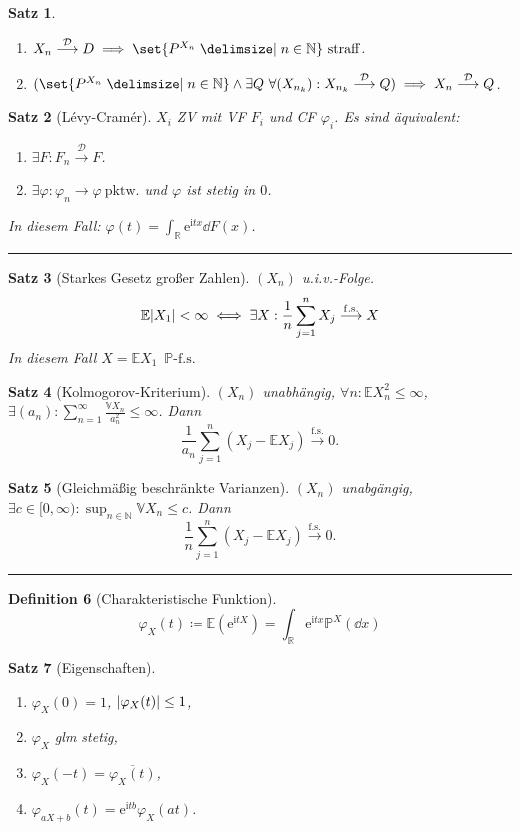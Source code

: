 \documentclass[a4paper,8pt]{article}
\newcounter{Sec}
\theoremstyle{nonumberbreak}
\newtheorem{definition}{Definition}[Sec]
\newtheorem{satz}[definition]{Satz}
\newcommand{\sep}{%
	\rule{\linewidth}{0.15pt}%
	\stepcounter{Sec}%
	}
\newcommand{\defas}{\coloneqq}
\newcommand{\conj}{\overline}
\renewcommand{\P}{\mathbb{P}}
\newcommand{\R}{\mathbb{R}}
\newcommand{\E}{\mathbb{E}}
\newcommand{\V}{\mathbb{V}}
\newcommand{\N}{\mathbb{N}}
\newcommand{\cf}{\varphi}
\newcommand{\e}{\mathrm{e}}
\renewcommand{\i}{\mathrm{i}}
\newcommand{\fsk}{\mathrel{\stackrel{\operatorname{f.s.}}{\longrightarrow}}}
\newcommand{\vk}{\mathrel{\stackrel{\mathcal{D}}{\longrightarrow}}}
\newcommand{\fs}[1]{~\operatorname{#1-f.s.}}
\begin{document}
\begin{multicols*}{3}
\begin{satz}
		\begin{enumerate}[label=(\alph*)]
			\item $X_n\vk D\implies\set{P^{X_n}\given n\in\N}~\text{straff}$.
			\item $(\set{P^{X_n}\given n\in\N}\wedge \exists Q~\forall (X_{n_k}): X_{n_k}\vk Q)\implies X_n\vk Q$.
		\end{enumerate}
	\end{satz}
	\begin{satz}[Lévy-Cramér]
		$X_i$ ZV mit VF $F_i$ und CF $\cf_i$. Es sind äquivalent:
		\begin{enumerate}[label=(\alph*)]
			\item $\exists F: F_n\vk F$.
			\item $\exists \cf: \cf_n\to\cf~\text{pktw.}$ und $\cf$ ist stetig in $0$.
		\end{enumerate}
		In diesem Fall: $\cf(t)=\int_\R\e^{\i tx}\dd{F(x)}$.
	\end{satz}
	\sep
	\begin{satz}[Starkes Gesetz großer Zahlen]
		$(X_n)$ u.i.v.-Folge.
		\[
			\E\abs{X_1}<\infty\iff
			\exists X:\frac{1}{n}\sum_{j=1}^nX_j\fsk X
		\]
		In diesem Fall $X=\E X_1 \fs{\P}$
	\end{satz}
	\begin{satz}[Kolmogorov-Kriterium]
		$(X_n)$ unabhängig, $\forall n:\E X_n^2\leq \infty$, $\exists (a_n): \sum_{n=1}^\infty \frac{\V X_n}{a_n^2}\leq \infty$.
		Dann \[\frac{1}{a_n}\sum_{j=1}^n(X_j-\E X_j)\fsk 0.\]
	\end{satz}
	\begin{satz}[Gleichmäßig beschränkte Varianzen]
		$(X_n)$ unabgängig, $\exists c\in[0,\infty):\sup_{n\in\N}\V X_n\leq c$. Dann
		\[\frac{1}{n}\sum_{j=1}^n(X_j-\E X_j)\fsk 0.\]
	\end{satz}
	\sep
	\begin{definition}[Charakteristische Funktion]
		\[
			\cf_X(t)\defas \E(\e^{\i tX}) = \int_\R \e^{\i tx}\P^X(\dd{x})
		\]
	\end{definition}
	\begin{satz}[Eigenschaften]
		{\setlength{\columnseprule}{0pt}\begin{multicols}{2}
		\begin{enumerate}[label=(\alph*)]
			\item $\cf_X(0)=1$, $\abs{\cf_X(t)}\leq 1$,
			\item $\cf_X$ glm stetig,
			\item $\cf_X(-t) = \conj{\cf_X(t)}$,
			\item $\cf_{aX+b}(t) = \e^{\i tb}\cf_X(at)$.

\end{enumerate}
\end{multicols}}
\end{satz}
\end{multicols*}
\end{document}
